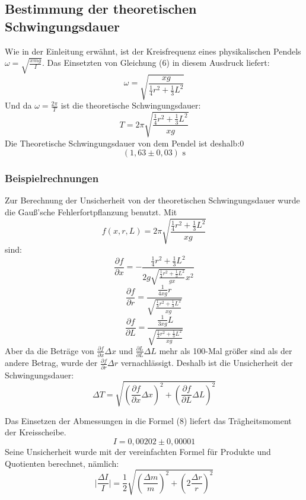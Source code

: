 \documentclass[11pt,a4paper]{article} %
\begin{document}
\subsection{Bestimmung der theoretischen Schwingungsdauer}
Wie in der Einleitung erwähnt, ist der Kreisfrequenz eines physikalischen Pendels $\omega = \sqrt{\frac{xmg}{I}}$. Das Einsetzten von Gleichung (6) in diesem Ausdruck liefert:
$$\omega = \sqrt{\frac{xg}{\frac{1}{4}r^2+\frac{1}{3}L^2}}$$
Und da $\omega = \frac{2\pi}{T}$ ist die theoretische Schwingungsdauer:
$$T = 2\pi \sqrt{\frac{\frac{1}{4}r^2+\frac{1}{3}L^2}{xg}}$$
Die Theoretische Schwingungsdauer von dem Pendel ist deshalb:0
$$(1,63\pm 0,03) \textrm{ s}$$
\begin{tcolorbox}[colback=white]
	\subsubsection{Beispielrechnungen}
	Zur Berechnung der Unsicherheit von der theoretischen Schwingungsdauer wurde die Gauß'sche Fehlerfortpflanzung benutzt. Mit
	$$f(x,r,L) = 2\pi \sqrt{\frac{\frac{1}{4}r^2+\frac{1}{3}L^2}{xg}}$$
	sind:
	$$\frac{\partial f}{\partial x} = -\frac{\frac{1}{4}r^2+\frac{1}{3}L^2}{2g\sqrt{\frac{\frac{1}{4}r^2+\frac{1}{3}L^2}{gx}}x^2} $$
	$$\frac{\partial f}{\partial r} = \frac{\frac{1}{4xg}r}{\sqrt{\frac{\frac{1}{4}r^2+\frac{1}{3}L^2}{xg}}}$$
	$$\frac{\partial f}{\partial L} = \frac{\frac{1}{3xg}L}{\sqrt{\frac{\frac{1}{4}r^2+\frac{1}{3}L^2}{xg}}}$$
	Aber da die Beträge von $\frac{ \partial f}{\partial x} \Delta x$ und $\frac{\partial L}{\partial L} \Delta L$ mehr als 100-Mal größer sind als der andere Betrag, wurde der $\frac{ \partial f}{\partial r} \Delta r$ vernachlässigt. Deshalb ist die Unsicherheit der Schwingungsdauer:
	$$\Delta T = \sqrt{ 
		(\frac{ \partial f}{\partial x} \Delta x)^2
		+(\frac{\partial f}{\partial L} \Delta L)^2
	}
	$$
	
\end{tcolorbox}

Das Einsetzen der Abmessungen in die Formel (8) liefert das Trägheitsmoment der Kreisscheibe. 
$$ I = 0,00202 \pm 0,00001$$
Seine Unsicherheit wurde mit der vereinfachten Formel für Produkte und Quotienten berechnet, nämlich:
$$\vert\frac{\Delta I}{I}\vert = \frac{1}{2}\sqrt{(\frac{\Delta m}{m})^2+(2\frac{\Delta r}{r})^2}$$
\end{document}
